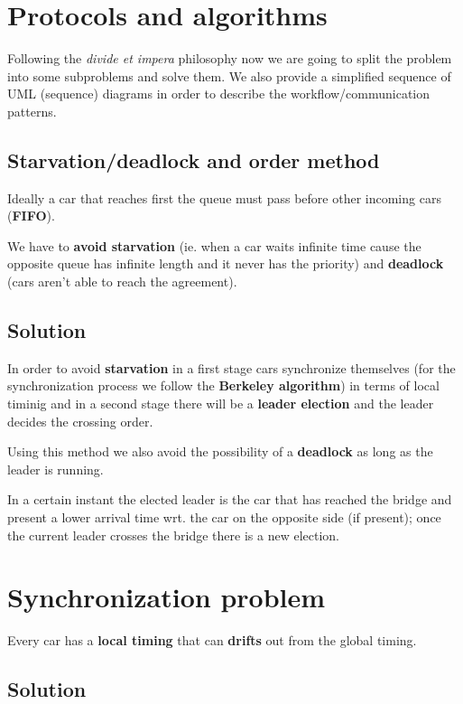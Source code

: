 \section{Protocols and algorithms}

Following the \textit{divide et impera} philosophy now we are going to split the problem 
into some subproblems and solve them. 
We also provide a simplified sequence of UML (sequence) diagrams in order to 
describe the workflow/communication patterns.


\subsection{Starvation/deadlock and order method}

Ideally a car that reaches first the queue must pass before other 
incoming cars (\textbf{FIFO}).

We have to \textbf{avoid starvation} (ie. when a car waits infinite time cause the opposite queue 
has infinite length and it never has the priority) and \textbf{deadlock} (cars aren't able to 
reach the agreement). 


\subsection{Solution}

In order to avoid \textbf{starvation} in a first stage cars synchronize themselves 
(for the synchronization process we follow the \textbf{Berkeley algorithm})
in terms of local timinig and in a second stage there will be a \textbf{leader election} 
and the leader decides the crossing order. 

Using this method we also avoid 
the possibility of a \textbf{deadlock} as long as the leader is running.

In a certain instant the elected leader is the car that has reached the bridge and 
present a lower arrival time wrt. the car on the opposite side (if present); 
once the current leader crosses the bridge there is a new election.\\


\section{Synchronization problem}

Every car has a \textbf{local timing} that can \textbf{drifts} out from the 
global timing. 


\subsection{Solution}

